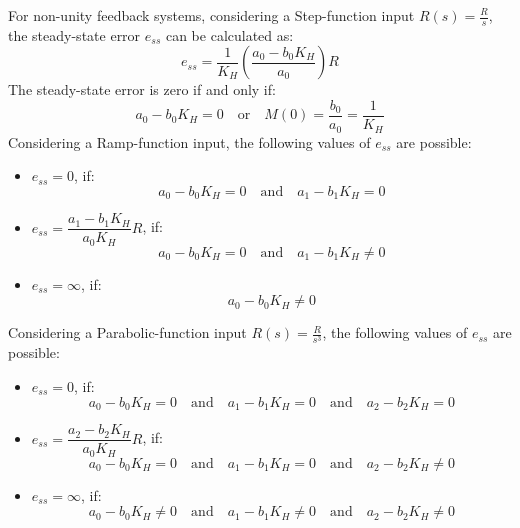 \documentclass[11pt]{article}
\begin{document}
\newpage
\noindent
For non-unity feedback systems, considering a Step-function input $R(s) = \frac{R}{s}$, the steady-state error $e_{ss}$ can be calculated as:
\begin{equation*}
    e_{ss} = \frac{1}{K_H} \left(\frac{a_0 - b_0K_H}{a_0}\right)R
\end{equation*}
The steady-state error is zero if and only if:
\begin{equation*}
    a_0 - b_0K_H = 0 \quad \text{or} \quad M(0) = \frac{b_0}{a_0} = \frac{1}{K_H}
\end{equation*}
\noindent
Considering a Ramp-function input, the following values of $e_{ss}$ are possible:
\begin{itemize}
    \item $e_{ss} = 0$, if:
    \begin{equation*}
        a_0 - b_0K_H = 0 \quad \text{and} \quad a_1 - b_1K_H = 0
    \end{equation*}
    \item $e_{ss} = \dfrac{a_1 - b_1K_H}{a_0K_H}R$, if:
    \begin{equation*}
        a_0 - b_0K_H = 0 \quad \text{and} \quad a_1 - b_1K_H \neq 0
    \end{equation*}
    \item $e_{ss} = \infty$, if:
    \begin{equation*}
        a_0 - b_0K_H \neq 0
    \end{equation*}
\end{itemize}

Considering a Parabolic-function input $R(s) = \frac{R}{s^3}$, the following values of $e_{ss}$ are possible:
\begin{itemize}
    \item $e_{ss} = 0$, if:
    \begin{equation*}
        a_0 - b_0K_H = 0 \quad \text{and} \quad a_1 - b_1K_H = 0 \quad \text{and} \quad a_2 - b_2K_H = 0
    \end{equation*}
    \item $e_{ss} = \dfrac{a_2 - b_2K_H}{a_0K_H}R$, if:
    \begin{equation*}
        a_0 - b_0K_H = 0 \quad \text{and} \quad a_1 - b_1K_H = 0 \quad \text{and} \quad a_2 - b_2K_H \neq 0
    \end{equation*}
    \item $e_{ss} = \infty$, if:
    \begin{equation*}
        a_0 - b_0K_H \neq 0 \quad \text{and} \quad a_1 - b_1K_H \neq 0 \quad \text{and} \quad a_2 - b_2K_H \neq 0
    \end{equation*}
\end{itemize}
\end{document}
